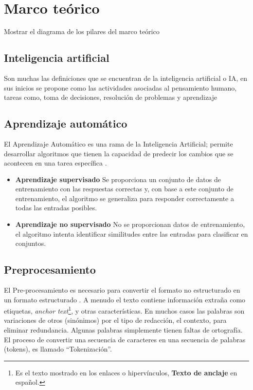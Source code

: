 \chapter{Marco teórico}
Mostrar el diagrama de los pilares del marco teórico


\section{Inteligencia artificial}
    Son muchas las definiciones que se encuentran de la inteligencia artificial o
    IA, en sus inicios se propone como las actividades asociadas al pensamiento
    humano, tareas como, toma de decisiones, resolución de problemas y aprendizaje \citep{SD1}    

\section{Aprendizaje automático}
    El Aprendizaje Automático es una rama de la Inteligencia Artificial; permite desarrollar 
    algoritmos que tienen la capacidad de predecir los cambios que se acontecen en una tarea específica \citep{SD2}.\\
    \begin{itemize}
        \item \textbf{Aprendizaje supervisado}
        Se proporciona un conjunto de datos de
        entrenamiento con las respuestas correctas y, con base a este conjunto
        de entrenamiento, el algoritmo se generaliza para responder correctamente 
        a todas las entradas posibles.
        \item \textbf{Aprendizaje no supervisado}
        No se proporcionan datos de entrenamiento, el algoritmo intenta identificar 
        similitudes entre las entradas para clasificar en conjuntos.    
    \end{itemize}

\section{Preprocesamiento}
    El Pre-procesamiento es necesario para convertir el formato no estructurado en un formato estructurado \citep{SD1}.
    A menudo el texto contiene información extraña como etiquetas, \textit{anchor text}\footnote{Es el texto mostrado en 
    los enlaces o hipervínculos, \textbf{Texto de anclaje} en español.}, y otras características. En muchos casos las palabras 
    son variaciones de otros (sinónimos) por el tipo de redacción, el contexto, para eliminar redundancia. Algunas palabras simplemente 
    tienen faltas de ortografía. El proceso de convertir una secuencia de caracteres en una secuencia de palabras (tokens), es llamado ``Tokenización''.

